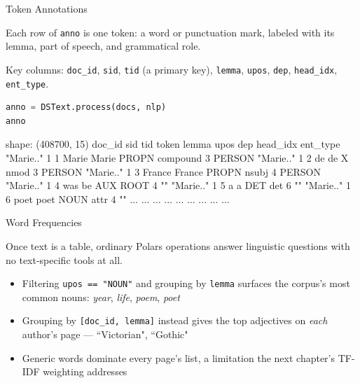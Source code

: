 \documentclass[8pt,aspectratio=169]{beamer}
\begin{document}
\begin{frame}[fragile]{Token Annotations}
\begin{splitcode}{%

Each row of \texttt{anno} is one token: a word or punctuation mark, labeled with its lemma, part of speech, and grammatical role.

Key columns: \texttt{doc\_id}, \texttt{sid}, \texttt{tid} (a primary key), \texttt{lemma}, \texttt{upos}, \texttt{dep}, \texttt{head\_idx}, \texttt{ent\_type}.

}
\begin{lstlisting}[language=Python]
anno = DSText.process(docs, nlp)
anno
\end{lstlisting}
\begin{codeoutput}
shape: (408700, 15)
doc_id     sid  tid  token   lemma   upos   dep       head_idx  ent_type
"Marie.."  1    1    Marie   Marie   PROPN  compound  3         PERSON
"Marie.."  1    2    de      de      X      nmod      3         PERSON
"Marie.."  1    3    France  France  PROPN  nsubj     4         PERSON
"Marie.."  1    4    was     be      AUX    ROOT      4         ""
"Marie.."  1    5    a       a       DET    det       6         ""
"Marie.."  1    6    poet    poet    NOUN   attr      4         ""
...        ...  ...  ...     ...     ...    ...       ...       ...
\end{codeoutput}
\end{splitcode}
\end{frame}

\begin{textframe}{Word Frequencies}

Once text is a table, ordinary Polars operations answer linguistic questions with no text-specific tools at all.

\begin{itemize}
\item Filtering \texttt{upos == "NOUN"} and grouping by \texttt{lemma} surfaces the corpus's most common nouns: \textit{year}, \textit{life}, \textit{poem}, \textit{poet}
\item Grouping by \texttt{[doc\_id, lemma]} instead gives the top adjectives on \textit{each} author's page --- ``Victorian", ``Gothic"
\item Generic words dominate every page's list, a limitation the next chapter's TF-IDF weighting addresses
\end{itemize}

\end{textframe}
\end{document}
